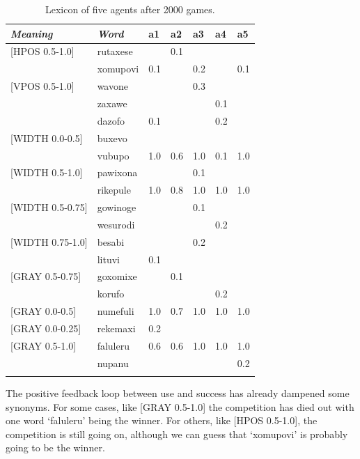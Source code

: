 \begin{table}
\begin{center}
\begin{tabular}{ l  l  l  l  l  l  l  }
\lsptoprule
{\itshape Meaning}&{\itshape Word}&{\bfshape  a1}&{\bfshape  a2}&{\bfshape  a3}&{\bfshape  a4}&{\bfshape  a5} \\ \midrule
{}[HPOS 0.5-1.0]&rutaxese& &0.1& & &\\ 
 & xomupovi&0.1& &0.2& &0.1\\ 
{}[VPOS 0.5-1.0]&wavone& & &0.3& &\\ 
 & zaxawe& & & &0.1& \\ 
 & dazofo&0.1& & &0.2&\\ 
{}[WIDTH 0.0-0.5]&buxevo& & & & & \\ 
 & vubupo&1.0&0.6&1.0&0.1&1.0\\ 
{}[WIDTH 0.5-1.0]&pawixona& & &0.1& & \\ 
 & rikepule&1.0&0.8&1.0&1.0&1.0\\ 
{}[WIDTH 0.5-0.75]&gowinoge& & &0.1& &  \\ 
 & wesurodi& & & &0.2&\\ 
{}[WIDTH 0.75-1.0]&besabi& & &0.2& & \\ 
 & lituvi&0.1& & & & \\ 
{}[GRAY 0.5-0.75]&goxomixe& &0.1& & & \\ 
 & korufo& & & &0.2&\\ 
{}[GRAY 0.0-0.5]&numefuli&1.0&0.7&1.0&1.0&1.0\\ 
{}[GRAY 0.0-0.25]&rekemaxi&0.2& & & & \\ 
{}[GRAY 0.5-1.0]&faluleru&0.6&0.6&1.0&1.0&1.0\\ 
 & nupanu& & & & &0.2 \\ 
\lspbottomrule
\end{tabular}
\caption{\label{tab:lex2000} Lexicon of five agents after 2000 games.}
\end{center}
\end{table}

The positive feedback loop between use and success
has already dampened some synonyms. For some cases, like [GRAY 0.5-1.0] the competition has died out 
with one word `faluleru' being the winner. 
For others, like [HPOS 0.5-1.0], the competition 
is still going on, although we can guess
that `xomupovi' is probably going to be the winner. 

